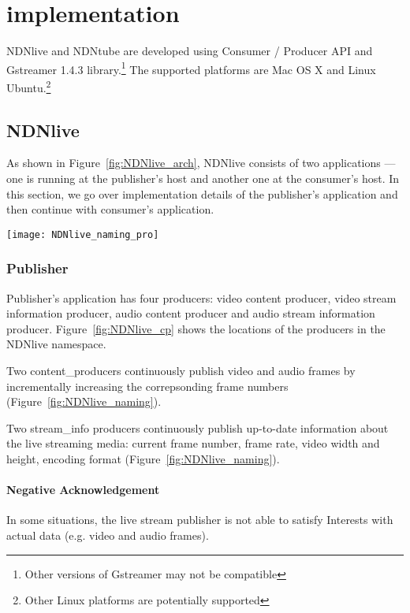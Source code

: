 \section{implementation} %
\label{sec:implementation}
NDNlive and NDNtube are developed using Consumer / Producer API and Gstreamer 1.4.3 library.\footnote{Other versions of Gstreamer may not be compatible}
The supported platforms are Mac OS X and Linux Ubuntu.\footnote{Other Linux platforms are potentially supported} 

\subsection{NDNlive}
As shown in Figure~\ref{fig:NDNlive_arch}, NDNlive consists of two applications --- one is running at the publisher's host and another one at the consumer's host. In this section, we go over implementation details of the publisher's application and then continue with consumer's application.

\begin{figure*}%
  \centering
  \texttt{[image: NDNlive\_naming\_pro]}
  \caption{Locations of producers and consumers in the NDNlive namespace.}
  \label{fig:NDNlive_cp}
\end{figure*}

\subsubsection{Publisher}
\label{ssub:NDNlive_pro}
Publisher's application has four producers: video content producer, video stream information producer, audio content producer and audio stream information producer. Figure~\ref{fig:NDNlive_cp} shows the locations of the producers in the NDNlive namespace. 

Two content\_producers continuously publish video and audio frames by incrementally increasing the correpsonding frame numbers (Figure~\ref{fig:NDNlive_naming}). 

Two stream\_info producers continuously publish up-to-date information about the live streaming media: current frame number, frame rate, video width and height, encoding format (Figure~\ref{fig:NDNlive_naming}).

\paragraph{Negative Acknowledgement} %
\label{par:negative_acknowledgement}
\vspace{0.3cm}
In some situations, the live stream publisher is not able to satisfy Interests with actual data (e.g. video and audio frames).


